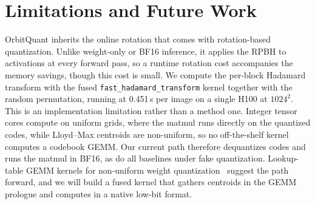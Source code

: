 \section{Limitations and Future Work}
\label{sec:limit}
OrbitQuant inherits the online rotation that comes with rotation-based quantization. Unlike weight-only or BF16 inference, it applies the RPBH to activations at every forward pass, so a runtime rotation cost accompanies the memory savings, though this cost is small. We compute the per-block Hadamard transform with the fused \texttt{fast\_hadamard\_transform} kernel together with the random permutation, running at 0.451\,s per image on a single H100 at $1024^2$. This is an implementation limitation rather than a method one. Integer tensor cores compute on uniform grids, where the matmul runs directly on the quantized codes, while Lloyd--Max centroids are non-uniform, so no off-the-shelf kernel computes a codebook GEMM. Our current path therefore dequantizes codes and runs the matmul in BF16, as do all baselines under fake quantization. Lookup-table GEMM kernels for non-uniform weight quantization~\cite{park2024lut, guo2024fast} suggest the path forward, and we will build a fused kernel that gathers centroids in the GEMM prologue and computes in a native low-bit format.